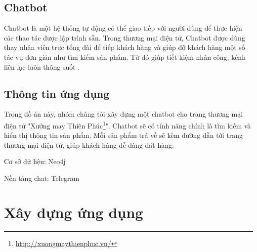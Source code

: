 \subsection{Chatbot}
	Chatbot là một hệ thống tự động có thể giao tiếp với người dùng để thực hiện các thao tác được lập trình sẵn.  Trong thương mại điện tử, Chatbot được dùng thay nhân viên trực tổng đài để tiếp khách hàng và giúp đỡ khách hàng một số tác vụ đơn giản như tìm kiếm sản phẩm. Từ đó giúp tiết kiệm nhân công, kênh liên lạc luôn thông suốt \cite{lazarevich_2018}.
	

\subsection{Thông tin ứng dụng}

Trong đồ án này, nhóm chúng tôi xây dựng một chatbot cho trang thương mại điện tử "Xưởng may Thiên Phúc\footnote{\url{http://xuongmaythienphuc.vn/}}". Chatbot sẽ có tính năng chính là tìm kiếm và hiển thị thông tin sản phẩm. Mỗi sản phẩm trả về sẽ kèm đường dẫn tới trang thương mại điện tử, giúp khách hàng dễ dàng đăt hàng.

Cơ sở dữ liệu: Neo4j \cite{neo4j}

Nền tảng chat: Telegram \cite{telegrambot}









\section{Xây dựng ứng dụng}

